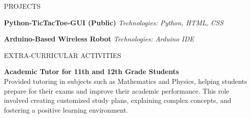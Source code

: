 \documentclass{resume}
\begin{document}
\begin{rSection}{PROJECTS}
\item \textbf{Python-TicTacToe-GUI (Public)} 
    \newline \textit{Technologies: Python, HTML, CSS}
    
\item \textbf{Arduino-Based Wireless Robot} 
    \newline \textit{Technologies: Arduino IDE}

\end{rSection}


\begin{rSection}{EXTRA-CURRICULAR ACTIVITIES}

\item \textbf{Academic Tutor for 11th and 12th Grade Students} \\
Provided tutoring in subjects such as Mathematics and Physics, helping students prepare for their exams and improve their academic performance. This role involved creating customized study plans, explaining complex concepts, and fostering a positive learning environment.

\end{rSection}
\end{document}
